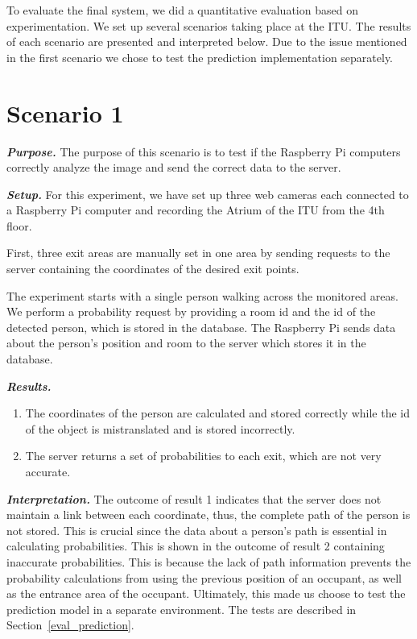 To evaluate the final system, we did a quantitative evaluation based on experimentation. We set up several scenarios taking place at the ITU. The results of each scenario are presented and interpreted below. Due to the issue mentioned in the first scenario we chose to test the prediction implementation separately.

\section{Scenario 1}
\label{sec:scen1}
\textit{\textbf{Purpose.}} The purpose of this scenario is to test if the Raspberry Pi computers correctly analyze the image and send the correct data to the server.

\textit{\textbf{Setup.}} For this experiment, we have set up three web cameras each connected to a Raspberry Pi computer and recording the Atrium of the ITU from the 4th floor.

First, three exit areas are manually set in one area by sending requests to the server containing the coordinates of the desired exit points. 

The experiment starts with a single person walking across the monitored areas. We perform a probability request by providing a room id and the id of the detected person, which is stored in the database. The Raspberry Pi sends data about the person's position and room to the server which stores it in the database.

\textit{\textbf{Results.}}
\begin{enumerate}
\item The coordinates of the person are calculated and stored correctly while the id of the object is mistranslated and is stored incorrectly. 
\item The server returns a set of probabilities to each exit, which are not very accurate.
\end{enumerate}

\textit{\textbf{Interpretation.}} The outcome of result 1 indicates that the server does not maintain a link between each coordinate, thus, the complete path of the person is not stored. This is crucial since the data about a person's path is essential in calculating probabilities. This is shown in the outcome of result 2 containing inaccurate probabilities. This is because the lack of path information prevents the probability calculations from using the previous position of an occupant, as well as the entrance area of the occupant. Ultimately, this made us choose to test the prediction model in a separate environment. The tests are described in Section~\ref{eval_prediction}.

